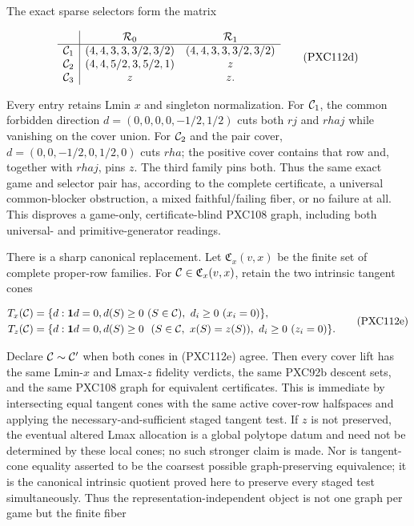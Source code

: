 \documentclass[11pt]{article}
\begin{document}
The exact sparse selectors form the matrix

\begin{equation}
\begin{array}{c|cc}
 &{\cal R}_0&{\cal R}_1\\ \hline
{\cal C}_1&(4,4,3,3,3/2,3/2)&(4,4,3,3,3/2,3/2)\\
{\cal C}_2&(4,4,5/2,3,5/2,1)&z\\
{\cal C}_3&z&z.
\end{array}                                                \tag{PXC112d}
\end{equation}

Every entry retains Lmin \(x\) and singleton normalization.  For
\({\cal C}_1\), the common forbidden direction
\(d=(0,0,0,0,-1/2,1/2)\) cuts both \(rj\) and \(rhaj\) while vanishing on the
cover union.  For \({\cal C}_2\) and the pair cover,
\(d=(0,0,-1/2,0,1/2,0)\) cuts \(rha\); the positive cover contains that row
and, together with \(rhaj\), pins \(z\).  The third family pins both.  Thus
the same exact game and selector pair has, according to the complete
certificate, a universal common-blocker obstruction, a mixed faithful/failing
fiber, or no failure at all.  This disproves a game-only, certificate-blind
PXC108 graph, including both universal- and primitive-generator readings.

There is a sharp canonical replacement.  Let
\(\mathfrak C_x(v,x)\) be the finite set of complete proper-row families.
For \({\cal C}\in\mathfrak C_x(v,x)\), retain the two intrinsic tangent
cones

\begin{equation}
\begin{split}
 T_x({\cal C})&=\{d:{\bf1}d=0, d(S)\ge0\ (S\in{\cal C}),
                         \ d_i\ge0\ (x_i=0)\},\\
 T_z({\cal C})&=\{d:{\bf1}d=0, d(S)\ge0\
       \ (S\in{\cal C},\ x(S)=z(S)),\ d_i\ge0\ (z_i=0)\}.
\end{split}
                                                               \tag{PXC112e}
\end{equation}

Declare \({\cal C}\sim{\cal C}'\) when both cones in (PXC112e) agree.
Then every cover lift has the same Lmin-\(x\) and Lmax-\(z\) fidelity
verdicts, the same PXC92b descent sets, and the same PXC108 graph for
equivalent certificates.  This is immediate by intersecting equal tangent
cones with the same active cover-row halfspaces and applying the
necessary-and-sufficient staged tangent test.  If \(z\) is not preserved, the
eventual altered Lmax allocation is a global polytope datum and need not be
determined by these local cones; no such stronger claim is made.
Nor is tangent-cone equality asserted to be the coarsest possible
graph-preserving equivalence; it is the canonical intrinsic quotient proved
here to preserve every staged test simultaneously.
Thus the representation-independent object is not one graph per game but the
finite fiber
\end{document}
